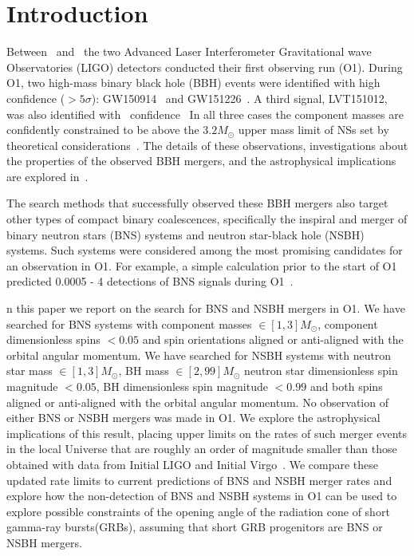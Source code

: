 
%
\section{Introduction}
Between \OoneSTART\ and \OoneEND\, the two Advanced Laser Interferometer Gravitational wave Observatories (LIGO) detectors conducted their first observing run (\ac{O1}).
During \ac{O1}, two high-mass binary black hole (\ac{BBH}) events
were identified with high confidence ($> 5 \sigma$): GW150914~\citep{Abbott:2016blz} and
GW151226~\citep{Abbott:2016nmj}. A third signal, LVT151012, was
also identified with \LVBLAHsignificance\ confidence~\citep{TheLIGOScientific:2016pea, TheLIGOScientific:2016qqj}
In all three cases the component masses are confidently constrained to be above the $3.2M_\odot$ upper mass limit of \acp{NS} set
by theoretical considerations~\citep{Rhoades:1974fn,TheLIGOScientific:2016wfe}.
The details of these observations, investigations about the properties
of the observed \ac{BBH} mergers, and the astrophysical implications are explored
in~\citep{TheLIGOScientific:2016wfe,Abbott:2016nhf,TheLIGOScientific:2016htt,TheLIGOScientific:2016src,TheLIGOScientific:2016pea, Abbott:2016izl}.

The search methods that successfully observed these \ac{BBH} mergers also target other types of compact
binary coalescences, specifically the inspiral and merger of binary neutron stars (\ac{BNS}) systems 
and neutron star-black hole (\ac{NSBH}) systems. Such systems were considered
among the most promising candidates for an observation in \ac{O1}. For example, a simple calculation
prior to the start of O1 predicted 0.0005 - 4 detections of \ac{BNS}
signals during O1~\citep{Aasi:2013wya}.

n this paper we report on the search for \ac{BNS} and \ac{NSBH} mergers in \ac{O1}. We have
searched for \ac{BNS} systems with component masses $\in [1,3] M_{\odot}$, component dimensionless
spins $< 0.05$ and spin orientations aligned or anti-aligned with the orbital angular momentum.
We have searched for \ac{NSBH} systems with neutron star mass $\in [1,3] M_{\odot}$,
\ac{BH} mass $\in [2,99] M_{\odot}$ neutron star dimensionless spin magnitude $< 0.05$,
\ac{BH} dimensionless spin magnitude $<0.99$ and both spins
aligned or anti-aligned with the orbital angular momentum.
No observation of
either \ac{BNS} or \ac{NSBH} mergers was made in \ac{O1}. We explore the astrophysical implications
of this result, placing upper limits on the rates of such merger events in the
local Universe that
are roughly an order of magnitude smaller than those obtained with data from Initial \ac{LIGO}
and Initial Virgo~\citep{Abbott:2007kv,Acernese:2008zzf,Colaboration:2011np}.
We compare these updated rate limits to current predictions of \ac{BNS} and
\ac{NSBH} merger rates and explore how the non-detection of \ac{BNS} and \ac{NSBH} systems in \ac{O1} can be used
to explore possible constraints of the opening angle of the radiation cone of short gamma-ray bursts(\acp{GRB}),
assuming that short \ac{GRB} progenitors are \ac{BNS} or \ac{NSBH} mergers.

